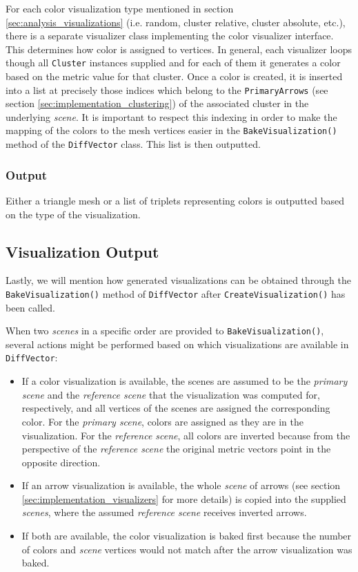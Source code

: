 For each color visualization type mentioned in section \ref{sec:analysis_visualizations} (i.e. random, cluster relative, cluster absolute, etc.), there is a separate visualizer class implementing the color visualizer interface. This determines how color is assigned to vertices. In general, each visualizer loops though all \verb+Cluster+ instances supplied and for each of them it generates a color based on the metric value for that cluster. Once a color is created, it is inserted into a list at precisely those indices which belong to the \verb+PrimaryArrows+ (see section \ref{sec:implementation_clustering}) of the associated cluster in the underlying {\it scene}. It is important to respect this indexing in order to make the mapping of the colors to the mesh vertices easier in the \verb+BakeVisualization()+ method of the \verb+DiffVector+ class. This list is then outputted.

\subsubsection{Output}

Either a triangle mesh or a list of triplets representing colors is outputted based on the type of the visualization.
\subsection{Visualization Output}

Lastly, we will mention how generated visualizations can be obtained through the \verb+BakeVisualization()+ method of \verb+DiffVector+ after \verb+CreateVisualization()+ has been called.

When two {\it scenes} in a specific order are provided to \verb+BakeVisualization()+, several actions might be performed based on which visualizations are available in \verb+DiffVector+:

\begin{itemize}
\item If a color visualization is available, the scenes are assumed to be the {\it primary scene} and the {\it reference scene} that the visualization was computed for, respectively, and all vertices of the scenes are assigned the corresponding color. For the {\it primary scene}, colors are assigned as they are in the visualization. For the {\it reference scene}, all colors are inverted because from the perspective of the {\it reference scene} the original metric vectors point in the opposite direction.
\item If an arrow visualization is available, the whole {\it scene} of arrows (see section \ref{sec:implementation_visualizers} for more details) is copied into the supplied {\it scenes}, where the assumed {\it reference scene} receives inverted arrows.
\item If both are available, the color visualization is baked first because the number of colors and {\it scene} vertices would not match after the arrow visualization was baked.
\end{itemize}

